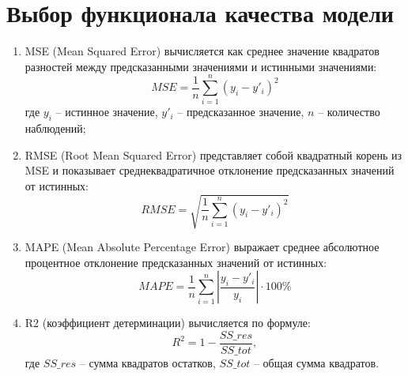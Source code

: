 \section{Выбор функционала качества модели}

\begin{enumerate}
    \item MSE (Mean Squared Error) вычисляется как среднее значение квадратов разностей между предсказанными значениями и истинными значениями:
    \begin{equation}
        MSE = \frac{1}{n}\sum_{i=1}^n (y_i - y'_i)^2
    \end{equation}
    где $y_i$ -- истинное значение, $y'_i$ -- предсказанное значение, $n$ -- количество наблюдений;
    \item RMSE (Root Mean Squared Error) представляет собой квадратный корень из MSE и показывает среднеквадратичное отклонение предсказанных значений от истинных:
    \begin{equation}
        RMSE = \sqrt{\frac{1}{n}\sum_{i=1}^n (y_i - y'_i)^2}
    \end{equation}
    
    \item MAPE (Mean Absolute Percentage Error) выражает среднее абсолютное процентное отклонение предсказанных значений от истинных:
    \begin{equation}
        MAPE = \frac{1}{n}\sum_{i=1}^n| \frac{y_i - y'_i}{y_i}| \cdot 100\%
    \end{equation}
    \item  R2 (коэффициент детерминации) вычисляется по формуле:
    \begin{equation}
        R^2 = 1 - \frac{SS\_res}{SS\_tot},
    \end{equation}
    где $SS\_res$ -- сумма квадратов остатков, $SS\_tot$ -- общая сумма квадратов.
\end{enumerate}


